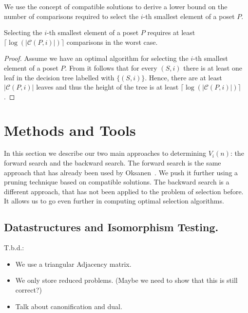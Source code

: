 \documentclass[twoside,leqno,twocolumn]{article}
\begin{document}
We use the concept of compatible solutions to derive a lower bound on the number of comparisons required to select the $i$-th smallest element of a poset $P$.

\begin{theorem}\label{theorem:compatible_log}
  Selecting the $i$-th smallest element of a poset $P$ requires at least $\lceil\log(|\mathcal{C}(P, i)|)\rceil$ comparisons in the worst case.
\end{theorem}

\begin{proof}
  Assume we have an optimal algorithm for selecting the $i$-th smallest element of a poset $P$.
  From  it follows that for every $(S, i)$ there is at least one leaf in the decision tree labelled with $\{(S, i)\}$.
  Hence, there are at least $|\mathcal{C}(P, i)|$ leaves and thus the height of the tree is at least $\lceil\log(|\mathcal{C}(P, i)|)\rceil$.
\end{proof}


\section{Methods and Tools}

In this section we describe our two main approaches to determining $V_i(n)$: the forward search and the backward search.
The forward search is the same approach that has already been used by Oksanen~\cite{Oksanen2006}.
We push it further using a pruning technique based on compatible solutions.
The backward search is a different approach, that has not been applied to the problem of selection before.
It allows us to go even further in computing optimal selection algorithms.

\subsection{Datastructures and Isomorphism Testing.}
T.b.d.:
\begin{itemize}
  \item We use a triangular Adjacency matrix.
  \item We only store reduced problems. (Maybe we need to show that this is still correct?)
  \item Talk about canonification and dual.
\end{itemize}
\end{document}
